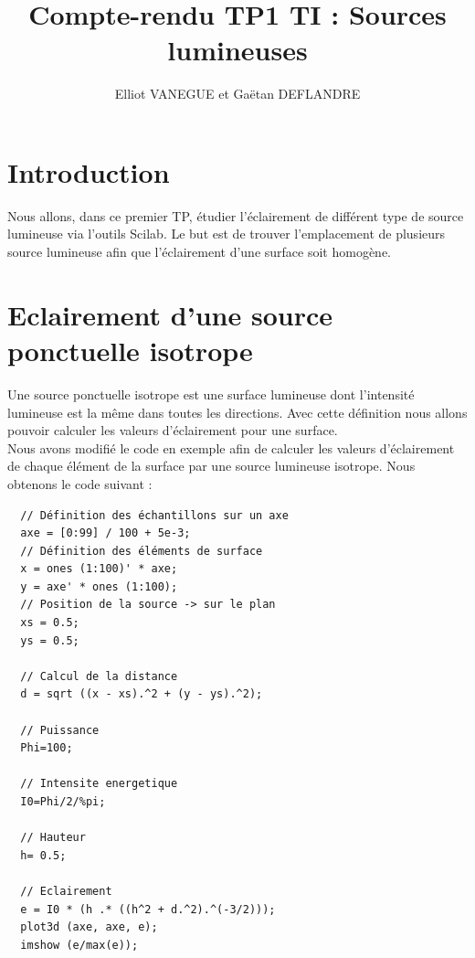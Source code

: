 \documentclass{article}
\title{Compte-rendu TP1 TI : Sources lumineuses}
\author{Elliot VANEGUE et Gaëtan DEFLANDRE}
\begin{document}



  \maketitle
  
  \mbox{}
  \newpage
  \clearpage
  
  \section{Introduction}
  Nous allons, dans ce premier TP, étudier l'éclairement de différent type
  de source lumineuse via l'outils Scilab. Le but est de trouver l'emplacement
  de plusieurs source lumineuse afin que l'éclairement d'une surface soit homogène.
  
  \section{Eclairement d'une source ponctuelle isotrope}
  Une source ponctuelle isotrope est une surface lumineuse dont l'intensité lumineuse
  est la même dans toutes les directions. Avec cette définition nous allons pouvoir
  calculer les valeurs d'éclairement pour une surface.\\
  
  Nous avons modifié le code en exemple afin de calculer les valeurs d'éclairement de 
  chaque élément de la surface par une source lumineuse isotrope. Nous obtenons le code 
  suivant :
  
  \begin{lstlisting}
  // Définition des échantillons sur un axe
  axe = [0:99] / 100 + 5e-3;
  // Définition des éléments de surface
  x = ones (1:100)' * axe;
  y = axe' * ones (1:100);
  // Position de la source -> sur le plan
  xs = 0.5;
  ys = 0.5;

  // Calcul de la distance
  d = sqrt ((x - xs).^2 + (y - ys).^2);

  // Puissance
  Phi=100;

  // Intensite energetique
  I0=Phi/2/%pi;

  // Hauteur
  h= 0.5;

  // Eclairement
  e = I0 * (h .* ((h^2 + d.^2).^(-3/2)));
  plot3d (axe, axe, e);
  imshow (e/max(e));

  \end{lstlisting}
  
\end{document}
